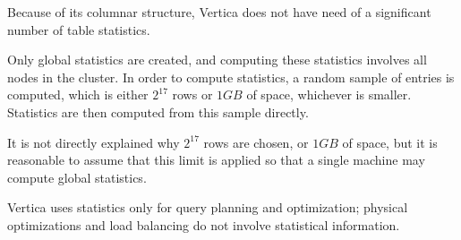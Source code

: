 Because of its columnar structure, Vertica does not have need of a significant number of table statistics.

Only global statistics are created, and computing these statistics involves all nodes in the cluster. In order to compute statistics, a random sample of entries is computed, which is either $2^{17}$ rows or $1GB$ of space, whichever is smaller. Statistics are then computed from this sample directly\cite{Vertica}.

It is not directly explained why $2^{17}$ rows are chosen, or $1GB$ of space, but it is reasonable to assume that this limit is applied so that a single machine may compute global statistics.

Vertica uses statistics only for query planning and optimization; physical optimizations and load balancing do not involve statistical information.

